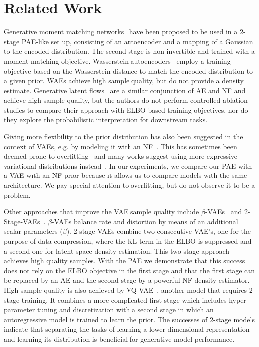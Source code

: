\documentclass[10pt]{article} \usepackage[accepted]{tmlr}
\begin{document}
\section{Related Work}
\label{sec:rel_work}
 Generative moment matching networks~\citep{GMMN} have been proposed to be used in a 2-stage PAE-like set up, consisting of an autoencoder and a mapping of a Gaussian to the encoded distribution. The second stage is non-invertible and trained with a moment-matching objective. Wasserstein autoencoders~\citep{WAE} employ a training objective based on the Wasserstein distance to match the encoded distribution to a given prior. WAEs achieve high sample quality, but do not provide a density estimate. Generative latent flows~\citep{GLF} are a similar conjunction of AE and NF and achieve high sample quality, but the authors do not perform controlled ablation studies to compare their approach with ELBO-based training objectives, nor do they explore the probabilistic interpretation for downstream tasks.

Giving more flexibility to the prior distribution has also been suggested in the context of VAEs, e.g. by modeling it with an NF~\citep{BauerM19,KSDDSSA17, TomczakW17Vamp}. This has sometimes been deemed prone to overfitting~\citep{TomczakW17Vamp} and many works suggest using more expressive variational distributions instead~\citep{KingmaSW16,RezendeM15, SalimansKW15, TranRB15}. In our experiments, we compare our PAE with a VAE with an NF prior because it allows us to compare models with the same architecture. We pay special attention to overfitting, but do not observe it to be a problem.

Other approaches that improve the VAE sample quality include $\beta$-VAEs~\citep{tishby2000,Alemi2016,Tkacik2018,beta-VAE} and
2-Stage-VAEs~\citep{2StageVAE}.
$\beta$-VAEs balance rate and distortion by means of an additional scalar parameters ($\beta$). 2-stage-VAEs combine two consecutive VAE's, one for the purpose of data compression, where the KL term in the ELBO is suppressed and a second one for latent space density estimation. 
This two-stage approach achieves high quality samples. With the PAE we demonstrate that this success does not rely on the ELBO objective in the first stage and that the first stage can be replaced by an AE and the second stage by a powerful NF density estimator. High sample quality is also achieved by VQ-VAE~\citep{OordVK17,RazaviOV19}, another model that requires 2-stage training. It combines a more complicated first stage which includes hyper-parameter tuning and discretization with a second stage in which an autoregressive model is trained to learn the prior. The successes of 2-stage models indicate that separating the tasks of learning a lower-dimensional representation and learning its distribution is beneficial for generative model performance.
\end{document}
